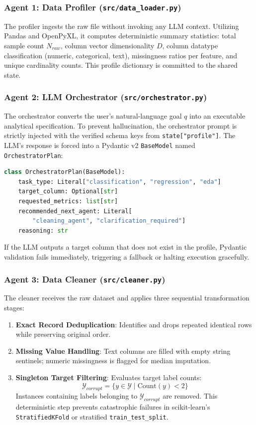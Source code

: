 \documentclass[conference]{IEEEtran}
\begin{document}
\subsubsection{Agent 1: Data Profiler (\texttt{src/data\_loader.py})}
The profiler ingests the raw file without invoking any LLM context. Utilizing Pandas and OpenPyXL, it computes deterministic summary statistics: total sample count $N_{raw}$, column vector dimensionality $D$, column datatype classification (numeric, categorical, text), missingness ratios per feature, and unique cardinality counts. This profile dictionary is committed to the shared state.

\subsubsection{Agent 2: LLM Orchestrator (\texttt{src/orchestrator.py})}
The orchestrator converts the user's natural-language goal $q$ into an executable analytical specification. To prevent hallucination, the orchestrator prompt is strictly injected with the verified schema keys from \texttt{state["profile"]}. The LLM's response is forced into a Pydantic v2 \texttt{BaseModel} named \texttt{OrchestratorPlan}:
\begin{lstlisting}[language=Python]
class OrchestratorPlan(BaseModel):
    task_type: Literal["classification", "regression", "eda"]
    target_column: Optional[str]
    requested_metrics: list[str]
    recommended_next_agent: Literal[
        "cleaning_agent", "clarification_required"]
    reasoning: str
\end{lstlisting}
If the LLM outputs a target column that does not exist in the profile, Pydantic validation fails immediately, triggering a fallback or halting execution gracefully.

\subsubsection{Agent 3: Data Cleaner (\texttt{src/cleaner.py})}
The cleaner receives the raw dataset and applies three sequential transformation stages:
\begin{enumerate}
    \item \textbf{Exact Record Deduplication}: Identifies and drops repeated identical rows while preserving original order.
    \item \textbf{Missing Value Handling}: Text columns are filled with empty string sentinels; numeric missingness is flagged for median imputation.
    \item \textbf{Singleton Target Filtering}: Evaluates target label counts:
    \begin{equation}
        \mathcal{Y}_{corrupt} = \{y \in \mathcal{Y} \mid \text{Count}(y) < 2\}
    \end{equation}
    Instances containing labels belonging to $\mathcal{Y}_{corrupt}$ are removed. This deterministic step prevents catastrophic failures in scikit-learn's \texttt{StratifiedKFold} or stratified \texttt{train\_test\_split}.
\end{enumerate}
\end{document}
